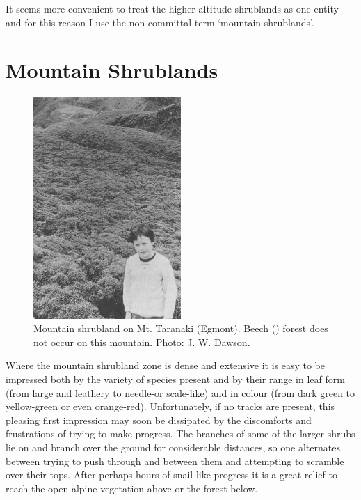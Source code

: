 It seems more convenient to treat the higher altitude shrublands as one entity and for this reason I use the non-committal term `mountain shrublands'.

\section{Mountain Shrublands}

\begin{figure}
	\includegraphics[width=0.5\textwidth]{graphics/figure91shrubland.jpg}
	\centering
	\caption[Mountain shrubland on Mt.
	Taranaki]{Mountain shrubland on Mt.
	Taranaki (Egmont).
	Beech () forest does not occur on this mountain.
	Photo: J. W. Dawson.}%
	\label{fig:91shrubland}
\end{figure}

Where the mountain shrubland zone is dense and extensive it is easy to be impressed both by the variety of species present and by their range in leaf form (from large and leathery to needle-or scale-like) and in colour (from dark green to yellow-green or even orange-red).
Unfortunately, if no tracks are present, this pleasing first impression may soon be dissipated by the discomforts and frustrations of trying to make progress.
The branches of some of the larger shrubs lie on and branch over the ground for considerable distances, so one alternates between trying to push through and between them and attempting to scramble over their tops.
After perhaps hours of snail-like progress it is a great relief to reach the open alpine vegetation above or the forest below.


